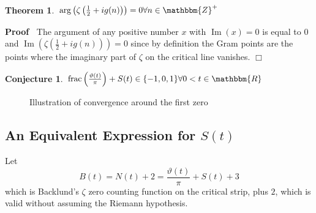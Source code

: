\documentclass{article}
\newcommand{\tmop}[1]{\ensuremath{\operatorname{#1}}}
\newenvironment{proof}{\noindent\textbf{Proof\ }}{\hspace*{\fill}$\Box$\medskip}
\newtheorem{conjecture}{Conjecture}
\newtheorem{theorem}{Theorem}
\begin{document}
\begin{theorem}
  $\arg \left( \zeta \left( \frac{1}{2} + i g (n) \right) \right) = 0 \forall
  n \in \mathbbm{Z}^+$
\end{theorem}

\begin{proof}
  The argument of any positive number $x$ with $\tmop{Im} (x) = 0$ is equal to
  $0$ and $\tmop{Im} \left( \zeta \left( \frac{1}{2} + i g (n) \right) \right)
  = 0$ since by definition the Gram points are the points where the imaginary
  part of $\zeta$ on the critical line vanishes.
\end{proof}

\begin{conjecture}
  $\tmop{frac} \left( \frac{\vartheta (t)}{\pi} \right) + S (t) \in \{ - 1, 0,
  1 \} \forall 0 < t \in \mathbbm{R}$
\end{conjecture}

\begin{figure}[h]
  \caption{Illustration of convergence around the first zero}
\end{figure}

\subsection{An Equivalent Expression for $S (t)$}

Let
\begin{equation}
  B (t) = N (t) + 2 = \frac{\vartheta (t)}{\pi} + S (t) + 3
\end{equation}
which is Backlund's $\zeta$ zero counting function on the critical strip, plus
$2$, which is valid without assuming the Riemann hypothesis.
\end{document}
